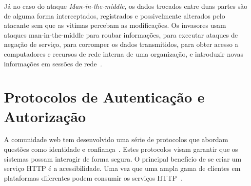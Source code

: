 Já no caso do ataque \emph{Man-in-the-middle}, os dados trocados entre duas partes são de alguma forma interceptados, registrados e possivelmente alterados pelo atacante sem que as vitimas percebam as modificações. Os invasores usam ataques man-in-the-middle para roubar informações, para executar ataques de negação de serviço, para corromper os dados transmitidos, para obter acesso a computadores e recursos de rede interna de uma organização, e introduzir novas informações em sessões de rede~\cite{kim2010fundamentals}.






\section{Protocolos de Autenticação e Autorização}
A comunidade web tem desenvolvido uma série de protocolos que abordam questões como identidade e confiança~\cite{Webber10}. Estes protocolos visam garantir que os sistemas possam interagir de forma segura. O principal benefício de se criar um serviço HTTP é a acessibilidade. Uma vez que uma ampla gama de clientes em plataformas diferentes podem consumir os serviços HTTP~\cite{lakshmiraghavan2013pro}.


